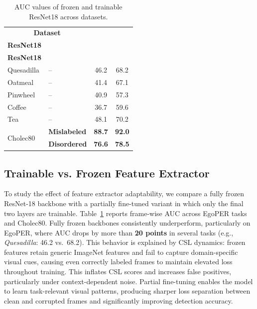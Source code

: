 \documentclass{article}
\theoremstyle{plain}
\theoremstyle{definition}
\theoremstyle{remark}
\begin{document}
\begin{table}[!ht]
\centering
\vspace{-0.5em}
\caption{AUC values of frozen and trainable ResNet18 across datasets.}
\label{tab:train_vs_frozen}
\begin{tabular}{llcc}
\toprule[1.5pt]
\multicolumn{2}{c}{\textbf{Dataset}} 
& \shortstack{\textbf{Frozen}\\\textbf{ResNet18}} 
& \shortstack{\textbf{Trainable}\\\textbf{ResNet18}} \\
\midrule[1pt]
Quesadilla & -- & 46.2 & 68.2 \\
Oatmeal    & -- & 41.4 & 67.1 \\
Pinwheel   & -- & 40.9 & 57.3 \\
Coffee     & -- & 36.7 & 59.6 \\
Tea        & -- & 48.1 & 70.2 \\
\midrule
\multirow{2}{*}{Cholec80} 
& \cellcolor[gray]{0.9}\textbf{Mislabeled} & \cellcolor[gray]{0.9}\textbf{88.7} & \cellcolor[gray]{0.9}\textbf{92.0} \\
& \cellcolor[gray]{0.9}\textbf{Disordered} & \cellcolor[gray]{0.9}\textbf{76.6} & \cellcolor[gray]{0.9}\textbf{78.5} \\
\bottomrule[1.5pt]
\end{tabular}
\vspace{-1em}
\end{table}

\vspace{-0.6em}
\subsection{Trainable vs. Frozen Feature Extractor}
\label{subsec:ablation_feature}
To study the effect of feature extractor adaptability, we compare a fully frozen ResNet-18 backbone with a partially fine-tuned variant in which only the final two layers are trainable. Table~\ref{tab:train_vs_frozen} reports frame-wise AUC across EgoPER tasks and Cholec80. Fully frozen backbones consistently underperform, particularly on EgoPER, where AUC drops by more than \textbf{20 points} in several tasks (e.g., \textit{Quesadilla}: 46.2 vs.\ 68.2). 
This behavior is explained by CSL dynamics: frozen features retain generic ImageNet features and fail to capture domain-specific visual cues, causing even correctly labeled frames to maintain elevated loss throughout training. This inflates CSL scores and increases false positives, particularly under context-dependent noise. Partial fine-tuning enables the model to learn task-relevant visual patterns, producing sharper loss separation between clean and corrupted frames and significantly improving detection accuracy.
\end{document}
